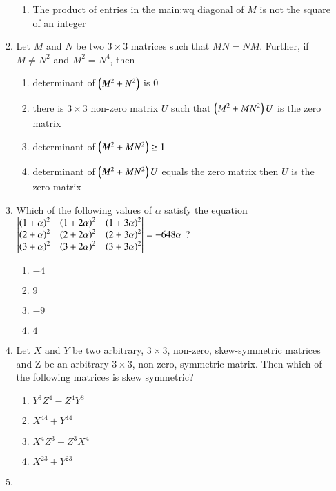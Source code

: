 \documentclass[journal,12pt,twocolumn]{IEEEtran}
\theoremstyle{remark}
\begin{document}
\begin{enumerate}
\begin{enumerate}
\begin{enumerate}
							\item The product of entries in the main:wq diagonal of $M$ is not the square of an integer
						\end{enumerate}
						\hfill {}
				\item
					Let $M$ and $N$ be two $3 \times 3$ matrices such that $MN=NM$. Further, if $M \neq N^2$ and $M^2 = N^4$, then
						\begin{enumerate}
							\item determinant of $\left(M^2 + N^2\right)$ is 0
							\item there is $3 \times 3$ non-zero matrix $U$ such that $\left(M^2+MN^2\right)U$ is the zero matrix
							\item determinant of $\left(M^2 + MN^2\right) \geq 1$
							\item determinant of $\left(M^2 + MN^2\right)U$ equals the zero matrix then $U$ is the zero matrix
						\end{enumerate}
						\hfill {}
				\item
					Which of the following values of $\alpha$ satisfy the equation
						$\begin{vmatrix}
							\left(1 + \alpha\right)^2 & \left(1 + 2\alpha\right)^2 & \left(1+3\alpha\right)^2\\
							\left(2 + \alpha\right)^2 & \left(2 + 2\alpha\right)^2 & \left(2+3\alpha\right)^2\\
							\left(3 + \alpha\right)^2 & \left(3 + 2\alpha\right)^2 & \left(3+3\alpha\right)^2
						\end{vmatrix} = -648 \alpha $ ?
							\begin{enumerate}
								\item $-4$
								\item $9$
								\item $-9$
								\item $4$
							\end{enumerate}
							\hfill {}
				\item
					Let $X$ and $Y$ be two arbitrary, $3 \times 3$, non-zero, skew-symmetric matrices and Z be an arbitrary $3 \times 3$, non-zero, symmetric matrix. Then which of the following matrices is  skew symmetric?
					\begin{enumerate}
						\item $Y^3Z^4 -Z^4Y^3$
						\item $X^{44} + Y^{44}$
						\item $X^4Z^3 -Z^3X^4$
						\item $X^{23} + Y^{23}$
					\end{enumerate}
					\hfill {}
				\item 

\end{enumerate}
\end{enumerate}
\end{document}
